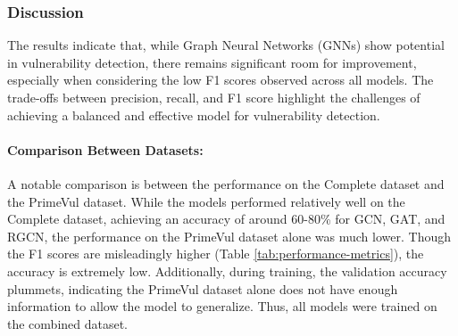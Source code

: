 \documentclass{article}
\begin{document}
\begin{table}[h]
    \centering
\caption{Comparison of Best and Worst Performing Vulnerabilities}
\label{tab:vulnerabilities}
\end{table}

\subsubsection{Discussion}
The results indicate that, while Graph Neural Networks (GNNs) show potential in vulnerability detection, there remains significant room for improvement, especially when considering the low F1 scores observed across all models. The trade-offs between precision, recall, and F1 score highlight the challenges of achieving a balanced and effective model for vulnerability detection.

\paragraph{Comparison Between Datasets:} 
A notable comparison is between the performance on the Complete dataset and the PrimeVul dataset. While the models performed relatively well on the Complete dataset, achieving an accuracy of around 60-80\% for GCN, GAT, and RGCN, the performance on the PrimeVul dataset alone was much lower. Though the F1 scores are misleadingly higher (Table \ref{tab:performance-metrics}), the  accuracy is extremely low. Additionally, during training, the validation accuracy plummets, indicating the PrimeVul dataset alone does not have enough information to allow the model to generalize. Thus, all models were trained on the combined dataset.
\end{document}
